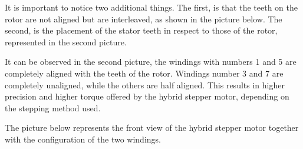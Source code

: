 It is important to notice two additional things. The first, is that the teeth on the rotor are not aligned but are interleaved, as shown in the picture below. The second, is the placement of the stator teeth in respect to those of the rotor, represented in the second picture.

\begin{figure}[htp] 
    \centering
    \hfill
\end{figure}

It can be observed in the second picture, the windings with numbers 1 and 5 are completely aligned with the teeth of the rotor. Windings number 3 and 7 are completely unaligned, while the others are half aligned. This results in higher precision and higher torque offered by the hybrid stepper motor, depending on the stepping method used.

The picture below represents the front view of the hybrid stepper motor together with the configuration of the two windings. 

